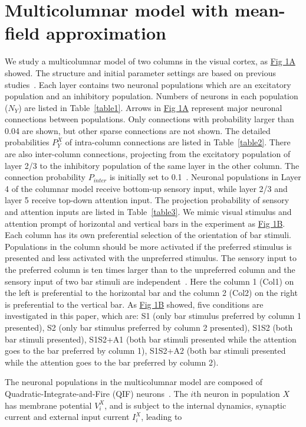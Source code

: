 \documentclass[10pt,letterpaper]{article}
\begin{document}
\section*{Multicolumnar model with mean-field approximation}
We study a multicolumnar model of two columns in the visual cortex, as \hyperlink{fig:fig1}{Fig 1A} showed. The structure and initial parameter settings are based on previous studies~\cite{wagatsuma2011}. Each layer contains two neuronal populations which are an excitatory population and an inhibitory population. Numbers of neurons in each population ($N_{Y}$) are listed in Table~\ref{table1}. Arrows in \hyperlink{fig:fig1}{Fig 1A} represent major neuronal connections between populations. Only connections with probability larger than 0.04 are shown, but other sparse connections are not shown. The detailed probabilities $P_{Y}^{X}$ of intra-column connections are listed in Table~\ref{table2}. There are also inter-column connections, projecting from the excitatory population of layer 2/3 to the inhibitory population of the same layer in the other column. The connection probability $P_{inter}$ is initially set to 0.1~\cite{wagatsuma2011}. Neuronal populations in Layer 4 of the columnar model receive bottom-up sensory input, while layer 2/3 and layer 5 receive top-down attention input. The projection probability of sensory and attention inputs are listed in Table~\ref{table3}. We mimic visual stimulus and attention prompt of horizontal and vertical bars in the experiment as \hyperlink{fig:fig1}{Fig 1B}. Each column has its own preferential selection of the orientation of bar stimuli. Populations in the column should be more activated if the preferred stimulus is presented and less activated with the unpreferred stimulus. The sensory input to the preferred column is ten times larger than to the unpreferred column and the sensory input of two bar stimuli are independent~\cite{wagatsuma2011}. Here the column 1 (Col1) on the left is preferential to the horizontal bar and the column 2 (Col2) on the right is preferential to the vertical bar. As \hyperlink{fig:fig1}{Fig 1B} showed, five conditions are investigated in this paper, which are: S1 (only bar stimulus preferred by column 1 presented), S2 (only bar stimulus preferred by column 2 presented), S1S2 (both bar stimuli presented), S1S2+A1 (both bar stimuli presented while the attention goes to the bar preferred by column 1), S1S2+A2 (both bar stimuli presented while the attention goes to the bar preferred by column 2).

The neuronal populations in the multicolumnar model are composed of Quadratic-Integrate-and-Fire (QIF) neurons~\cite{kotani2014}. The $i$th neuron in population $X$ has membrane potential $V_{i}^{X}$, and is subject to the internal dynamics, synaptic current and external input current $I_{i}^{X}$, leading to 
\end{document}

